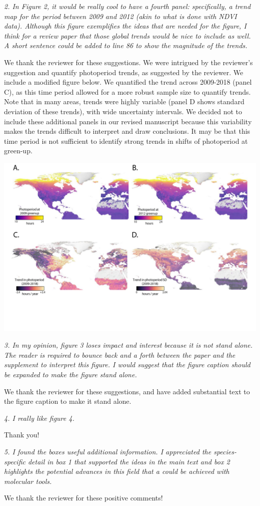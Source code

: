 \documentclass{article}
\begin{document}
\par \emph{2. In Figure 2, it would be really cool to have a fourth panel: specifically, a trend map for the period between 2009 and 2012 (akin to what is done with NDVI data). Although this figure exemplifies the ideas that are needed for the figure, I think for a review paper that those global trends would be nice to include as well. A short sentence could be added to line 86 to show the magnitude of the trends. }
\par We thank the reviewer for these suggestions. We were intrigued by the reviewer's suggestion and quantify photoperiod trends, as suggested by the reviewer. We include a modified figure below. We quantified the trend across 2009-2018 (panel C), as this time period allowed for a more robust sample size to quantify trends. Note that in many areas, trends were highly variable (panel D shows standard deviation of these trends), with wide uncertainty intervals. We decided not to include these additional panels in our revised manuscript because this variability makes the trends difficult to interpret and draw conclusions. It may be that this time period is not sufficient to identify strong trends in shifts of photoperiod at green-up. 
\par
\includegraphics{../figures/Greenup_corr_sm_leg_4panels_sds.pdf} %

\par \emph{3. In my opinion, figure 3 loses impact and interest because it is not stand alone. The reader is required to bounce back and a forth between the paper and the supplement to interpret this figure. I would suggest that the figure caption should be expanded to make the figure stand alone. }
\par We thank the reviewer for these suggestions, and have added substantial text to the figure caption to make it stand alone. 

\par \emph{4. I really like figure 4. }
\par Thank you!
\par \emph{5. I found the boxes useful additional information. I appreciated the species-specific detail in box 1 that supported the ideas in the main text and box 2 highlights the potential advances in this field that a could be achieved with molecular tools.}
\par We thank the reviewer for these positive comments!
\end{document}
